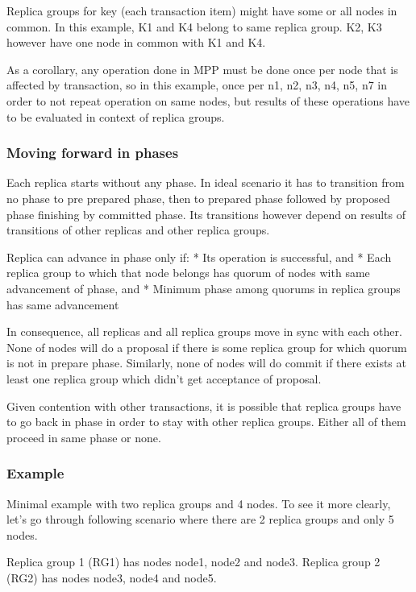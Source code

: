 Replica groups for key (each transaction item) might have some or all nodes in common.
In this example, K1 and K4 belong to same replica group. K2, K3 however have one node in common with K1 and K4.


As a corollary, any operation done in MPP must be done once per node that is affected by transaction, so in this example, once per n1, n2, n3, n4, n5, n7 in order to not repeat operation on same nodes, but results of these operations have to be evaluated in context of replica groups. 


\subsubsection{Moving forward in phases}
Each replica starts without any phase. In ideal scenario it has to transition from no phase to pre prepared phase, then to prepared phase followed by proposed phase finishing by committed phase. Its transitions however depend on results of transitions of other replicas and other replica groups.


Replica can advance in phase only if:
* Its operation is successful, and
* Each replica group to which that node belongs has quorum of nodes with same advancement of phase, and
* Minimum phase among quorums in replica groups has same advancement


In consequence, all replicas and all replica groups move in sync with each other. None of nodes will do a proposal if there is some replica group for which quorum is not in prepare phase. Similarly, none of nodes will do commit if there exists at least one replica group which didn’t get acceptance of proposal.


Given contention with other transactions, it is possible that replica groups have to go back in phase in order to stay with other replica groups. Either all of them proceed in same phase or none.


\subsubsection{Example}
Minimal example with two replica groups and 4 nodes.
To see it more clearly, let’s go through following scenario where there are 2 replica groups and only 5 nodes. 


Replica group 1 (RG1) has nodes node1, node2 and node3. 
Replica group 2 (RG2) has nodes node3, node4 and node5.


